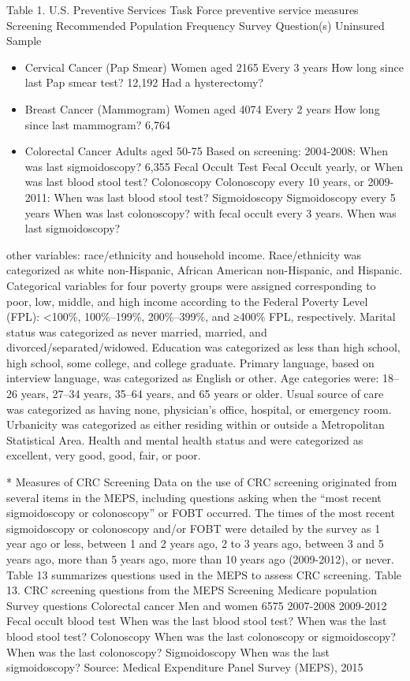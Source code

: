 \documentclass[../main.tex]{subfiles}
\begin{document}
Table 1. U.S. Preventive Services Task Force preventive service measures Screening Recommended Population Frequency Survey Question(s) Uninsured 
Sample
\begin{itemize}
    \item Cervical Cancer (Pap Smear) Women aged 2165 Every 3 years How long since last Pap smear test? 12,192 Had a hysterectomy? 
    \item Breast Cancer (Mammogram) Women aged 4074 Every 2 years How long since last mammogram? 6,764 
    \item Colorectal Cancer Adults aged 50-75 Based on screening: 2004-2008: When was last sigmoidoscopy? 6,355 Fecal Occult Test Fecal Occult yearly, or When was last blood stool test?
    Colonoscopy Colonoscopy every 10 years, or 2009-2011: When was last blood stool test? Sigmoidoscopy Sigmoidoscopy every 5 years When was last colonoscopy? with fecal occult every 3 years. When was last sigmoidoscopy?
    
\end{itemize}
other variables:
race/ethnicity and household income. Race/ethnicity was categorized as white non-Hispanic, African American non-Hispanic, and Hispanic. Categorical variables for four poverty groups were assigned corresponding to poor, low, middle, and high income according to the Federal Poverty Level (FPL): <100\%, 100\%–199\%, 200\%–399\%, and ≥400\% FPL, respectively.
Marital status was categorized as never married, married, and divorced/separated/widowed. Education was categorized as less than high school, high school, some college, and college graduate. Primary language, based on interview language, was categorized as English or other. Age categories were: 18–26 years, 27–34 years, 35–64 years, and 65 years or older. Usual source of care was categorized as having none, physician’s office, hospital, or emergency room. Urbanicity was categorized as either residing within or outside a Metropolitan Statistical Area. Health and mental health status and were categorized as excellent, very good, good, fair, or poor.

* Measures of CRC Screening
Data on the use of CRC screening originated from several items in the MEPS, including questions asking when the “most recent sigmoidoscopy or colonoscopy” or FOBT occurred. The times of the most recent sigmoidoscopy or colonoscopy and/or FOBT were detailed by the survey as 1 year ago or less, between 1 and 2 years ago, 2 to 3 years ago, between 3 and 5 years ago, more than 5 years ago, more than 10 years ago 
(2009-2012), or never. Table 13 summarizes questions used in the MEPS to assess CRC screening. Table 13. CRC screening questions from the MEPS Screening Medicare population Survey questions Colorectal cancer Men and women 6575 2007-2008 2009-2012 Fecal occult blood test When was the last blood stool test? When was the last blood stool test? Colonoscopy When was the last colonoscopy or sigmoidoscopy? When was the last colonoscopy? Sigmoidoscopy When was the last sigmoidoscopy? Source: Medical Expenditure Panel Survey (MEPS), 2015
\end{document}
